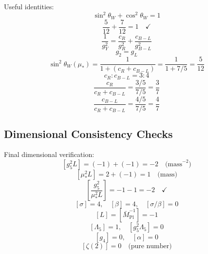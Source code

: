 \documentclass[11pt,a4paper]{article}
\begin{document}
Useful identities:
\begin{equation}
\label{eq:ext-id-1}
\sin^2\theta_W + \cos^2\theta_W = 1
\end{equation}
\begin{equation}
\label{eq:ext-id-2}
\frac{5}{12} + \frac{7}{12} = 1 \quad \checkmark
\end{equation}
\begin{equation}
\label{eq:ext-id-3}
\frac{1}{g_Y^2} = \frac{c_R}{g_R^2} + \frac{c_{B-L}}{g_{B-L}^2}
\end{equation}
\begin{equation}
\label{eq:ext-id-4}
g_2 = g_L
\end{equation}
\begin{equation}
\label{eq:ext-id-5}
\sin^2\theta_W(\mu_*) = \frac{1}{1 + (c_R + c_{B-L})} = \frac{1}{1 + 7/5} = \frac{5}{12}
\end{equation}
\begin{equation}
\label{eq:ext-id-6}
c_R : c_{B-L} = 3 : 4
\end{equation}
\begin{equation}
\label{eq:ext-id-7}
\frac{c_R}{c_R + c_{B-L}} = \frac{3/5}{7/5} = \frac{3}{7}
\end{equation}
\begin{equation}
\label{eq:ext-id-8}
\frac{c_{B-L}}{c_R + c_{B-L}} = \frac{4/5}{7/5} = \frac{4}{7}
\end{equation}

\subsection*{Dimensional Consistency Checks}
\label{subsec:dim-checks}

Final dimensional verification:
\begin{equation}
\label{eq:dim-check-1}
[g_5^2 L] = (-1) + (-1) = -2 \quad \text{(mass}^{-2}\text{)}
\end{equation}
\begin{equation}
\label{eq:dim-check-2}
[\mu_*^2 L] = 2 + (-1) = 1 \quad \text{(mass)}
\end{equation}
\begin{equation}
\label{eq:dim-check-3}
\left[\frac{g_5^2}{\mu_*^2 L}\right] = -1 - 1 = -2 \quad \checkmark
\end{equation}
\begin{equation}
\label{eq:dim-check-4}
[\sigma] = 4, \quad [\beta] = 4, \quad [\sigma/\beta] = 0
\end{equation}
\begin{equation}
\label{eq:dim-check-5}
[L] = [\bar{M}_{\text{Pl}}^{-1}] = -1
\end{equation}
\begin{equation}
\label{eq:dim-check-6}
[\Lambda_5] = 1, \quad [g_5^2 \Lambda_5] = 0
\end{equation}
\begin{equation}
\label{eq:dim-check-7}
[g_4] = 0, \quad [\alpha] = 0
\end{equation}
\begin{equation}
\label{eq:dim-check-8}
[\zeta(2)] = 0 \quad \text{(pure number)}
\end{equation}
\end{document}
